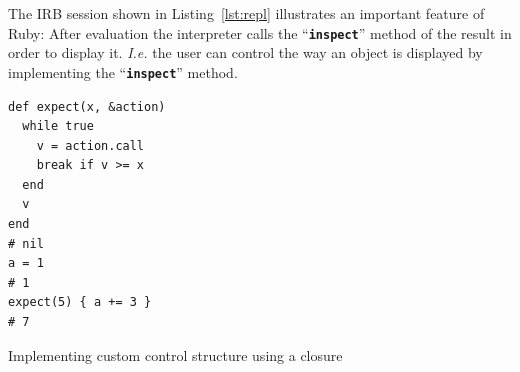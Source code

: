 \documentclass[10pt,journal,compsoc]{joser13}
\newcommand{\code}[1]{``\texttt{\textbf{\textcolor{codegray}{\small{#1}}}}''}
\newcommand{\lst}[1]{Listing~\ref{lst:#1}}
\begin{document}
The \ac{IRB} session shown in \lst{repl} illustrates an important feature of Ruby: After evaluation the interpreter calls the \code{inspect} method of the result in order to display it. \emph{I.e.} the user can control the way an object is displayed by implementing the \code{inspect} method.

\begin{listing}[htbp]
  \begin{verbatim}
def expect(x, &action)
  while true
    v = action.call
    break if v >= x
  end
  v
end
# nil
a = 1
# 1
expect(5) { a += 3 }
# 7
  \end{verbatim}
  \caption{Implementing custom control structure using a closure\label{lst:closure}}
\end{listing}









\end{document}
